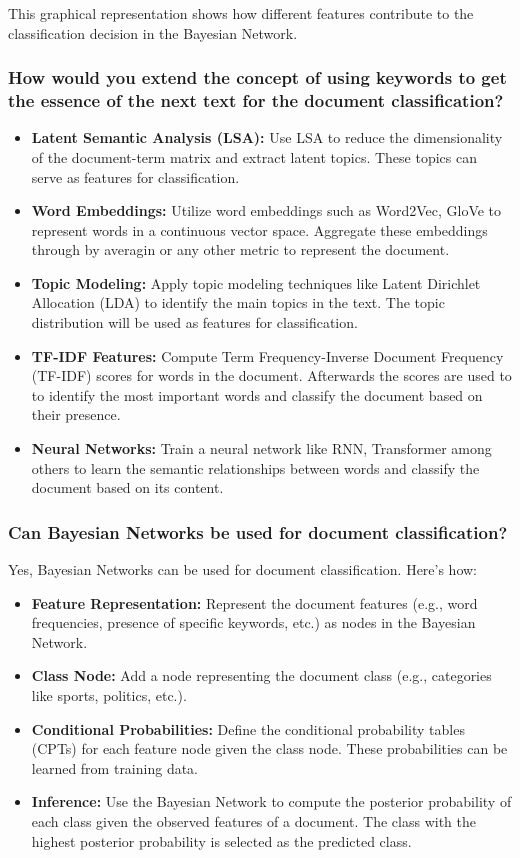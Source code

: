 \documentclass{article}
\begin{document}
This graphical representation shows how different features contribute to the classification decision in the Bayesian Network.


\subsubsection*{How would you extend the concept of using keywords to get the essence of the next text for the document classification?}
\begin{itemize}
    \item \textbf{Latent Semantic Analysis (LSA):} Use LSA to reduce the dimensionality of the document-term matrix and extract latent topics.
     These topics can serve as features for classification.
    \item \textbf{Word Embeddings:} Utilize word embeddings such as Word2Vec, GloVe to represent words in a continuous vector space. 
    Aggregate these embeddings through by averagin or any other metric to represent the document.
    \item \textbf{Topic Modeling:} Apply topic modeling techniques like Latent Dirichlet Allocation (LDA) to identify the main topics in the text.
     The topic distribution will be used as features for classification.
    \item \textbf{TF-IDF Features:} Compute Term Frequency-Inverse Document Frequency (TF-IDF) scores for words in the document. 
    Afterwards the scores are used to to identify the most important words and classify the document based on their presence.
    \item \textbf{Neural Networks:} Train a neural network like RNN, Transformer among others to learn the semantic relationships between words and classify the document based on its content.
\end{itemize}

\subsubsection*{Can Bayesian Networks be used for document classification?}
Yes, Bayesian Networks can be used for document classification. Here's how:

\begin{itemize}
    \item \textbf{Feature Representation:} Represent the document features (e.g., word frequencies, presence of specific keywords, etc.) as nodes in the Bayesian Network.
    \item \textbf{Class Node:} Add a node representing the document class (e.g., categories like sports, politics, etc.).
    \item \textbf{Conditional Probabilities:} Define the conditional probability tables (CPTs) for each feature node given the class node. These probabilities can be learned from training data.
    \item \textbf{Inference:} Use the Bayesian Network to compute the posterior probability of each class given the observed features of a document. The class with the highest posterior probability is selected as the predicted class.
\end{itemize}
\end{document}
